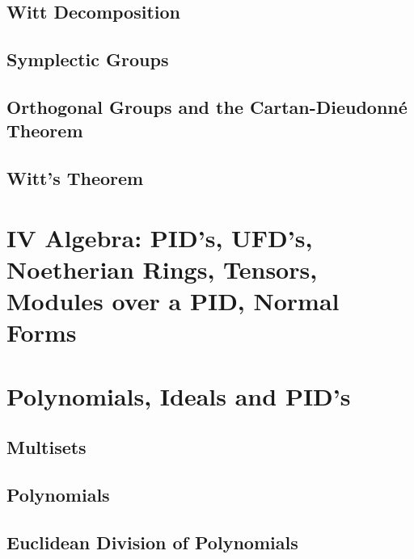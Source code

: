 \documentclass[a4paper]{article}
\begin{document}
\subsection{ Witt Decomposition} %

\subsection{ Symplectic Groups} %

\subsection{ Orthogonal Groups and the Cartan-Dieudonné Theorem} %

\subsection{ Witt's Theorem} %


\newpage
\section*{IV Algebra: PID’s, UFD’s, Noetherian Rings, Tensors, Modules over a PID, Normal Forms}
\section{Polynomials, Ideals and PID’s}
\subsection{ Multisets} %

\subsection{ Polynomials} %

\subsection{ Euclidean Division of Polynomials} %
\end{document}

